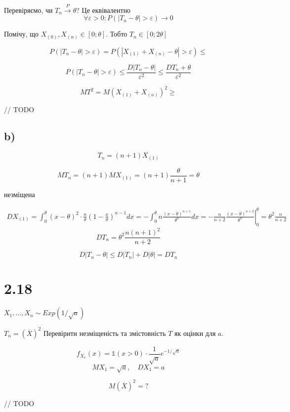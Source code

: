 \documentclass[11pt, a4paper]{article} %
\begin{document}
Перевіряємо, чи $T_n \overset{P}{\longrightarrow} \theta$?
Це еквівалентно 
$$\forall \varepsilon>0: P(|T_n - \theta| > \varepsilon) \longrightarrow 0$$

Помічу, що $X_{(0)}, X_{(n)} \in [0;\theta]$. Тобто $T_n \in [0;2\theta]$

$$P(|T_n - \theta| > \varepsilon) = P(|X_{(1)} + X_{(n)} - \theta| > \varepsilon) 
\le $$

$$P(|T_n - \theta| > \varepsilon) \le \frac{D|T_n - \theta|}{\varepsilon^2} \le \frac{DT_n + \theta}{\varepsilon^2}$$

$$MT^2 = M(X_{(1)}+X_{(n)})^2 \ge $$

// TODO


\subsection*{b)}
$$T_n = (n+1) X_{(1)}$$

$$MT_n = (n+1) MX_{(1)} = (n+1) \frac{\theta}{n+1} = \theta$$
\begin{mdframed}[style=ans]
    незміщена
\end{mdframed}

\begin{multline*}
    DX_{(1)} = \int_0^\theta (x-\theta)^2 \cdot \frac{n}{\theta} (1-\frac{x}{\theta})^{n-1} dx
    = - \int_0^\theta n \frac{(x-\theta)^{n+1}}{\theta^n} dx 
    = - \left. \frac{n}{n+2} \frac{(x-\theta)^{n+2}}{\theta^n} \right|_0^\theta  
    = \theta^2\frac{n}{n+2}
\end{multline*}
$$DT_n = \theta^2 \frac{n(n+1)^2}{n+2}$$

$$D|T_n - \theta| \le D|T_n| + D|\theta| = DT_n$$

\section*{2.18}
\begin{mdframed}
    $X_1,...,X_n \sim Exp(1/\sqrt a)$ 

    $T_n = (\overline X)^2$
    Перевірити незміщеність та змістовність $T$ як оцінки для $a$.
\end{mdframed}

$$f_{X_1}(x) = \mathbb{1}(x > 0) \cdot \frac{1}{\sqrt a} e^{-1/\sqrt a}$$
$$MX_1 = \sqrt a, \quad DX_1 = a$$

$$M(\overline X)^2 = ?$$

// TODO
\end{document}
